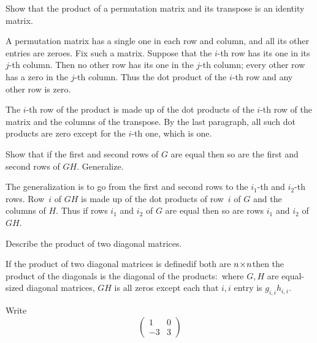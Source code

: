 \begin{exercises}
\begin{answer}
    \end{answer}
  \recommended \item \label{exer:PermTimesTransEqId}
    Show that the product of a permutation matrix and its transpose
    is an identity matrix.
    \begin{answer}
      A permutation matrix has a single one in each row and column, and
      all its other entries are zeroes.
      Fix such a matrix.
      Suppose that the \( i \)-th row has its one in its \( j \)-th column.
      Then no other row has its one in the \( j \)-th column; every other
      row has a zero in the \( j \)-th column.
      Thus the dot product of the \( i \)-th row and any other row is zero.

      The \( i \)-th row of the product is made up of the dot products of the
      \( i \)-th row of the matrix and the columns of the transpose.
      By the last paragraph, all such dot products are zero except for the
      \( i \)-th one, which is one.  
    \end{answer}
  \item 
    Show that if the first and second rows of \( G \) are equal then so
    are the first and second rows of \( GH \).
    Generalize.
    \begin{answer}
      The generalization is to go from the first and second rows to the
      $i_1$-th and $i_2$-th rows.
      Row~$i$ of \( GH \) is made up of the dot products of
      row~$i$ of \( G \) and the columns of \( H \).
      Thus if rows \( i_1 \) and \( i_2 \) of \( G \) are equal then so are
      rows \( i_1 \) and \( i_2 \) of \( GH \).  
    \end{answer}
  \item 
    Describe the product of two diagonal matrices.
    \begin{answer}
      If the product of two diagonal matrices is defined\Dash if 
      both are $n \! \times \! n$\Dash then 
      the product of the diagonals is the diagonal
      of the products:~where \( G,H \) are equal-sized diagonal matrices,
      \( GH \) is all zeros except each that \( i,i \) entry is
      \( g_{i,i}h_{i,i} \).
    \end{answer}
  \item 
    Write
    \begin{equation*}
      \begin{pmatrix}
        1   &0  \\
        -3  &3
      \end{pmatrix}
    \end{equation*}

\end{exercises}
